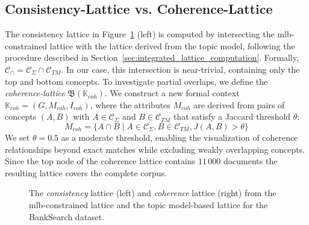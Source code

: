 \subsection{Consistency-Lattice vs. Coherence-Lattice}
\label{sec:consistency_vs_coherence}

The consistency lattice in Figure~\ref{fig:consistency_coherence_lattices} (left) is computed by intersecting the \ac{mlb}-constrained lattice with the lattice derived from the topic model, following the procedure described in Section~\ref{sec:integrated_lattice_computation}.
Formally, $\mathcal{C}_{\cap} = \mathcal{C}_{\Sigma} \cap \mathcal{C}_{TM}$. In our case, this intersection is near-trivial, containing only the top and bottom concepts.
To investigate partial overlaps, we define the \textit{coherence-lattice} $\mathfrak{B}(\mathbb{K}_{coh})$. We construct a new formal context $\mathbb{K}_{coh} = (G, M_{coh}, I_{coh})$, where the attributes $M_{coh}$ are derived from pairs of concepts $(A, B)$ with $A \in \mathcal{C}_{\Sigma}$ and $B \in \mathcal{C}_{TM}$ that satisfy a Jaccard threshold $\theta$:
\begin{equation}
    M_{coh} = \{ A \cap B \mid A \in \mathcal{C}_{\Sigma}, B \in \mathcal{C}_{TM}, J(A, B) > \theta \}
\end{equation}
We set $\theta = 0.5$ as a moderate threshold, enabling the visualization of coherence relationships beyond exact matches while excluding weakly overlapping concepts.
Since the top node of the coherence lattice contains $11\,000$ documents the resulting lattice covers the complete corpus.

\begin{figure}[t]
\centering

\begin{subfigure}{0.45\textwidth}
    \centering
    
\end{subfigure}
\hfill
\begin{subfigure}{0.45\textwidth}
    \centering
    
\end{subfigure}

\caption{The \emph{consistency} lattice (left) and \emph{coherence} lattice (right) from the \ac{mlb}-constrained lattice and the topic model-based lattice for the BankSearch dataset.}
\label{fig:consistency_coherence_lattices}

\end{figure}
